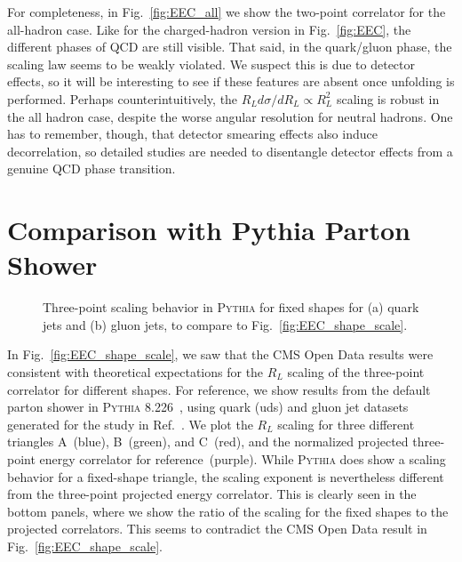 \documentclass[aps,prl,twocolumn,showpacs,10pt,superscriptaddress,preprintnumbers,nofootinbib,longbibliography]{revtex4-1}
\DeclareRobustCommand{\Fig}[1]{Fig.~\ref{#1}}
\begin{document}
For completeness, in \Fig{fig:EEC_all} we show the two-point correlator for the all-hadron case.
%
Like for the charged-hadron version in \Fig{fig:EEC}, the different phases of QCD are still visible.
%
That said, in the quark/gluon phase, the scaling law seems to be weakly violated.
%
We suspect this is due to detector effects, so it will be interesting to see if these features are absent once unfolding is performed.
%
Perhaps counterintuitively, the $R_L d\sigma/d R_L \propto  R_L^2$ scaling is robust in the all hadron case, despite the worse angular resolution for neutral hadrons.
%
One has to remember, though, that detector smearing effects also induce decorrelation, so detailed studies are needed to disentangle detector effects from a genuine QCD phase transition.

\section{Comparison with Pythia Parton Shower}
\label{sec:pythia}

\begin{figure}[]
\caption{Three-point scaling behavior in \textsc{Pythia} for fixed shapes for (a) quark jets and (b) gluon jets, to compare to \Fig{fig:EEC_shape_scale}.}
\label{fig:pythia_shape_scale}
\end{figure}

In \Fig{fig:EEC_shape_scale}, we saw that the CMS Open Data results were consistent with theoretical expectations for the $R_L$ scaling of the three-point correlator for different shapes.
%
For reference, we show results from the default parton shower in \textsc{Pythia 8.226}~\cite{Sjostrand:2014zea}, using quark (uds) and gluon jet datasets generated for the study in Ref.~\cite{Komiske:2018cqr}.
%
We plot the $R_L$ scaling for three different triangles A~(blue), B~(green), and C~(red), and the normalized projected three-point energy correlator for reference~(purple).
%
While \textsc{Pythia} does show a scaling behavior for a fixed-shape triangle, the scaling exponent is nevertheless different from the three-point projected energy correlator. This is clearly seen in the bottom panels, where we show the ratio of the scaling for the fixed shapes to the projected correlators.
%
This seems to contradict the CMS Open Data result in \Fig{fig:EEC_shape_scale}.
\end{document}
